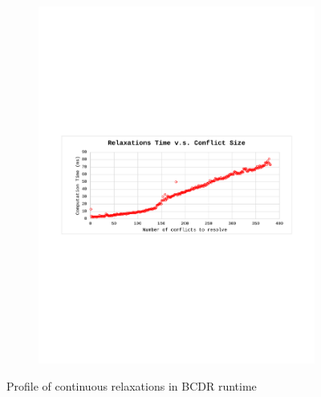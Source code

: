 \documentclass[jair,twoside,11pt,theapa]{article}
\begin{document}
\begin{figure}[!ht]
\begin{subfigure}[b]{0.8\textwidth}
		\includegraphics[width=\textwidth,trim={2.6cm 10.2cm 2.4cm 10.3cm},clip]{figures/BunchConflict/relaxation_time_nobunch.pdf}
		\caption{}
		\label{fig:cont_relaxation_time}
	\end{subfigure}
	\caption{Profile of continuous relaxations in BCDR runtime}
	\label{fig:conflict_resolution_time_1}
\end{figure}
\end{document}
